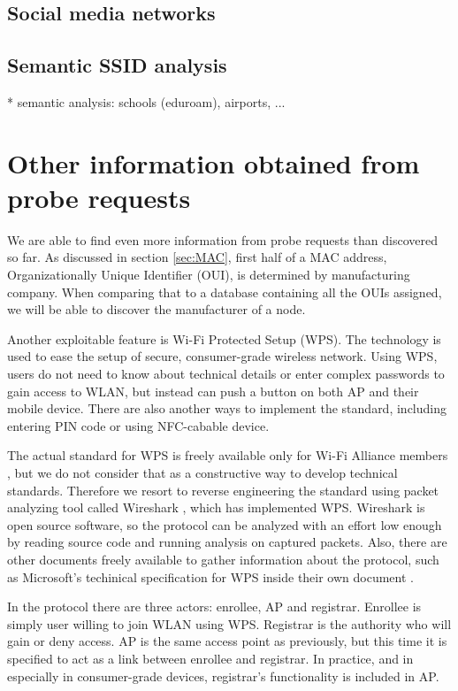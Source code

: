 \documentclass[12pt,a4paper,oneside,pdftex]{report}
\begin{document}
\subsection{Social media networks}
\label{subsec:social_media}

\subsection{Semantic SSID analysis}
* semantic analysis: schools (eduroam), airports, ...

\section{Other information obtained from probe requests}
\label{sec:other_info}

We are able to find even more information from probe requests than discovered so far. As discussed in section \ref{sec:MAC}, first half of a MAC address, Organizationally Unique Identifier (OUI), is determined by manufacturing company. When comparing that to a database containing all the OUIs assigned, we will be able to discover the manufacturer of a node.

Another exploitable feature is Wi-Fi Protected Setup (WPS). The technology is used to ease the setup of secure, consumer-grade wireless network. Using WPS, users do not need to know about technical details or enter complex passwords to gain access to WLAN, but instead can push a button on both AP and their mobile device. There are also another ways to implement the standard, including entering PIN code or using NFC-cabable device. \cite{alliance2007wi}

The actual standard for WPS is freely available only for Wi-Fi Alliance members \cite{alliance2007wi}, but we do not consider that as a constructive way to develop technical standards. Therefore we resort to reverse engineering the standard using packet analyzing tool called Wireshark \cite{wireshark}, which has implemented WPS. Wireshark is open source software, so the protocol can be analyzed with an effort low enough by reading source code and running analysis on captured packets. Also, there are other documents freely available to gather information about the protocol, such as Microsoft's techinical specification for WPS inside their own document \cite{microsoftWCN}.

In the protocol there are three actors: enrollee, AP and registrar. Enrollee is simply user willing to join WLAN using WPS. Registrar is the authority who will gain or deny access. AP is the same access point as previously, but this time it is specified to act as a link between enrollee and registrar. In practice, and in especially in consumer-grade devices, registrar's functionality is included in AP. 
\end{document}
